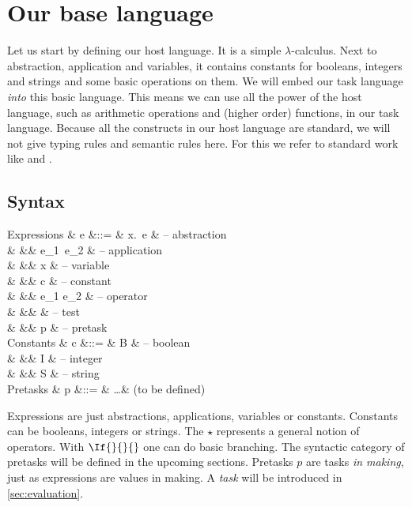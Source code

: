 
\section{Our base language}

Let us start by defining our host language.
It is a simple $\lambda$-calculus.
Next to abstraction, application and variables,
it contains constants for booleans, integers and strings
and some basic operations on them.
We will embed our task language \emph{into} this basic language.
This means we can use all the power of the host language,
such as arithmetic operations and (higher order) functions,
in our task language.
Because all the constructs in our host language are standard,
we will not give typing rules and semantic rules here.
For this we refer to standard work like \textcite{books/Pierce02TAPL} and \textcite{books/Harper16PFPL}.


\subsection{Syntax}
\label{sec:syntax}

\begin{grammar}
  Expressions
    & e &::= & \lambda x.\ e      & – abstraction \\
    &   &\mid& e_1\ e_2           & – application \\
    &   &\mid& x                  & – variable \\
    &   &\mid& c                  & – constant \\
    &   &\mid& e_1 \star e_2      & – operator \\
    &   &\mid&  & – test \\
    &   &\mid& p                  & – pretask \\
  Constants
    & c &::= & B                  & – boolean \\
    &   &\mid& I                  & – integer \\
    &   &\mid& S                  & – string \\
  Pretasks
    & p &::= & \ldots             & (to be defined) \\
\end{grammar}
Expressions are just abstractions, applications, variables or constants.
Constants can be booleans, integers or strings.
The $\star$ represents a general notion of operators.
With $\If{}{}{}$ one can do basic branching.
The syntactic category of pretasks will be defined in the upcoming sections.
Pretasks $p$ are tasks \emph{in making},
just as expressions are values in making.
A \emph{task} will be introduced in \autoref{sec:evaluation}.

